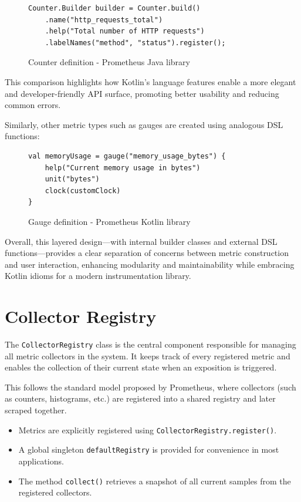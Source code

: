 \begin{figure}[h]
    \begin{lstlisting}
Counter.Builder builder = Counter.build()
    .name("http_requests_total")
    .help("Total number of HTTP requests")
    .labelNames("method", "status").register();
    \end{lstlisting}
    \caption{Counter definition - Prometheus Java library}
\end{figure}

This comparison highlights how Kotlin’s language features enable a more elegant and developer-friendly \ac{API}
surface, promoting better usability and reducing common errors.

Similarly, other metric types such as gauges are created using analogous \ac{DSL} functions:

\begin{figure}[h]
    \begin{lstlisting}
val memoryUsage = gauge("memory_usage_bytes") {
    help("Current memory usage in bytes")
    unit("bytes")
    clock(customClock)
}
    \end{lstlisting}
    \caption{Gauge definition - Prometheus Kotlin library}
\end{figure}

Overall, this layered design—with internal builder classes and external \ac{DSL} functions—provides a clear separation
of concerns between metric construction and user interaction, enhancing modularity and maintainability while embracing Kotlin idioms for a modern instrumentation library.


\section{Collector Registry}\label{sec:collector-registry}

The \texttt{CollectorRegistry} class is the central component responsible for managing all metric collectors in the system.
It keeps track of every registered metric and enables the collection of their current state when an exposition is triggered.

This follows the standard model proposed by Prometheus, where collectors (such as counters, histograms, etc.) are registered into a shared registry and later scraped together.

\begin{itemize}
    \item Metrics are explicitly registered using \texttt{CollectorRegistry.register()}.
    \item A global singleton \texttt{defaultRegistry} is provided for convenience in most applications.
    \item The method \texttt{collect()} retrieves a snapshot of all current samples from the registered collectors.
\end{itemize}

